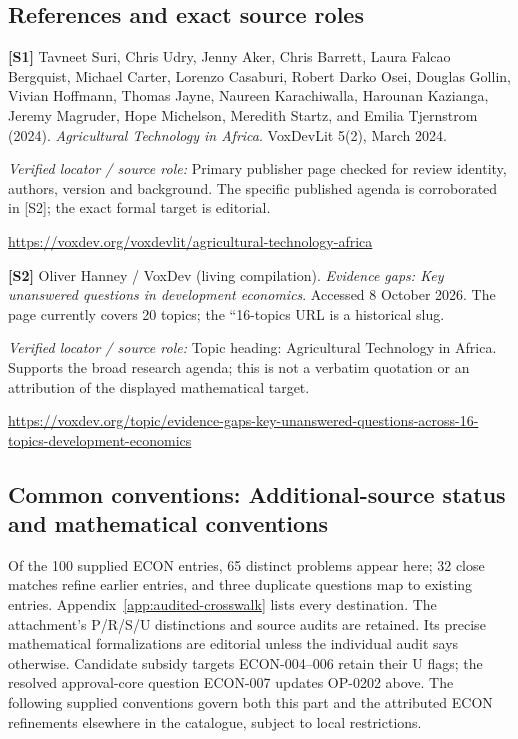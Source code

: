 \documentclass[11pt,a4paper]{article}
\begin{document}
\subsection*{References and exact source roles}

{\footnotesize\raggedright
\par\noindent\textbf{[S1]} Tavneet Suri, Chris Udry, Jenny Aker, Chris Barrett, Laura Falcao Bergquist, Michael Carter, Lorenzo Casaburi, Robert Darko Osei, Douglas Gollin, Vivian Hoffmann, Thomas Jayne, Naureen Karachiwalla, Harounan Kazianga, Jeremy Magruder, Hope Michelson, Meredith Startz, and Emilia Tjernstrom (2024). \emph{Agricultural Technology in Africa}. VoxDevLit 5(2), March 2024.\par \textit{Verified locator / source role:} Primary publisher page checked for review identity, authors, version and background. The specific published agenda is corroborated in [S2]; the exact formal target is editorial.\par \url{https://voxdev.org/voxdevlit/agricultural-technology-africa}\par\smallskip
\par\noindent\textbf{[S2]} Oliver Hanney / VoxDev (living compilation). \emph{Evidence gaps: Key unanswered questions in development economics}. Accessed 8 October 2026. The page currently covers 20 topics; the ``16-topics URL is a historical slug.\par \textit{Verified locator / source role:} Topic heading: Agricultural Technology in Africa. Supports the broad research agenda; this is not a verbatim quotation or an attribution of the displayed mathematical target.\par \url{https://voxdev.org/topic/evidence-gaps-key-unanswered-questions-across-16-topics-development-economics}\par\smallskip
}

\subsection*{Common conventions: Additional-source status and mathematical conventions}

\label{audited:conventions}

Of the 100 supplied ECON entries, 65 distinct problems appear here; 32 close
matches refine earlier entries, and three duplicate questions map to existing
entries. Appendix~\ref{app:audited-crosswalk} lists every destination.
The attachment's P/R/S/U distinctions and source audits are retained. Its
precise mathematical formalizations are editorial unless the individual audit
says otherwise. Candidate subsidy targets ECON-004--006 retain their U flags;
the resolved approval-core question ECON-007 updates OP-0202 above.
The following supplied conventions govern both this part and the attributed
ECON refinements elsewhere in the catalogue, subject to local restrictions.
\end{document}
